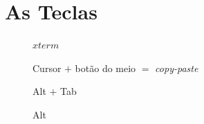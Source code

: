 \documentclass[final,a4paper]{article}
\begin{document}

\section{As Teclas}


\begin{description}


\item[] $xterm$
\item[] Cursor $+$ botão do meio $=$ \textit{copy-paste}
\item[] Alt $+$ Tab
\item[] Alt


\end{description}
\end{document}

